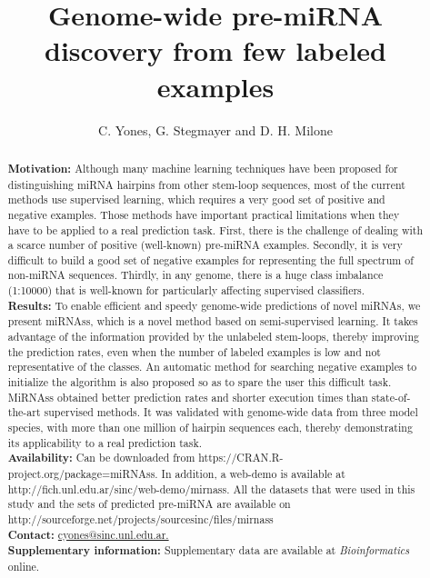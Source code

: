 \documentclass{article}
\title{\normalfont Genome-wide pre-miRNA discovery from few labeled examples}
\date{}
\author{C. Yones, G. Stegmayer and D. H. Milone}
\affil{\small  Research Institute for Signals, Systems and Computational Intelligence, sinc(\textit{i}), FICH-UNL, CONICET, Santa Fe, Argentina.}
\begin{document}
\setcounter{page}{73}

\maketitle

\begin{abstract}
	\noindent \textbf{Motivation:} Although many machine learning techniques have been proposed for distinguishing miRNA hairpins from other stem-loop sequences, most of the current methods use supervised learning, which requires a very good set of positive and negative examples. Those methods have important practical limitations when they have to be applied to a real prediction task. First, there is the challenge of dealing with a scarce number of positive (well-known) pre-miRNA examples. Secondly, it is very difficult to build a good set of negative examples for representing the full spectrum of non-miRNA sequences. Thirdly, in any genome, there is a huge class imbalance (1:10000) that is well-known for particularly affecting supervised classifiers.  \\
	\textbf{Results:} To enable efficient and speedy genome-wide predictions of novel miRNAs, we present miRNAss, which is a novel method based on semi-supervised learning. It  takes advantage of the information provided by the unlabeled stem-loops, thereby improving the prediction rates, even when the number of labeled examples is low and not representative of the classes. An automatic method for searching negative examples to initialize the algorithm is also proposed so as to spare the user this difficult task. MiRNAss obtained better prediction rates and shorter execution times than state-of-the-art supervised methods. It was validated with genome-wide data from three model species, with more than one million of hairpin sequences each, thereby demonstrating its applicability to a real prediction task. \\
	\textbf{Availability:} Can be downloaded from https://CRAN.R-project.org/package=miRNAss. In addition, a web-demo is available at http://fich.unl.edu.ar/sinc/web-demo/mirnass. All the datasets that were used in this study and the sets of predicted pre-miRNA are available on \\ http://sourceforge.net/projects/sourcesinc/files/mirnass \\
	\textbf{Contact:} \href{cyones@sinc.unl.edu.ar}{cyones@sinc.unl.edu.ar.} \\
	\textbf{Supplementary information:} Supplementary data are available at \textit{Bioinformatics} online.
\end{abstract}
\end{document}
